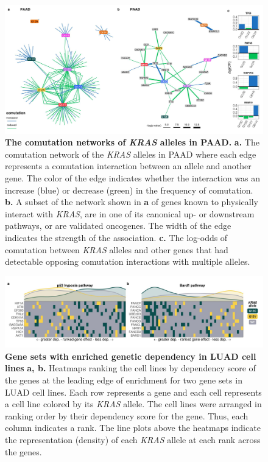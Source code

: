 \documentclass[english, 10pt, letterpaper]{article}
\newcommand{\KRAS}{\emph{KRAS}}
\begin{document}
\begin{figure}[h!]
\centering
\includegraphics[width=180mm]{figures/Supp_Fig_4.jpeg}
\caption{
    \textbf{The comutation networks of \KRAS{} alleles in PAAD.}
    \textbf{a.} The comutation network of the \KRAS{} alleles in PAAD where each edge represents a comutation interaction between an allele and another gene. The color of the edge indicates whether the interaction was an increase (blue) or decrease (green) in the frequency of comutation.
    \textbf{b.} A subset of the network shown in \textbf{a} of genes known to physically interact with \KRAS{}, are in one of its canonical up- or downstream pathways, or are validated oncogenes. The width of the edge indicates the strength of the association.
    \textbf{c.} The log-odds of comutation between \KRAS{} alleles and other genes that had detectable opposing comutation interactions with multiple alleles.
}
\label{sfig:paad-comutation-network}
\end{figure}
\newpage


\begin{figure}[h!]
\centering
\includegraphics[width=180mm]{figures/Supp_Fig_5.jpeg}
\caption{
    \textbf{Gene sets with enriched genetic dependency in LUAD cell lines}
    \textbf{a, b.} Heatmaps ranking the cell lines by dependency score of the genes at the leading edge of enrichment for two gene sets in LUAD cell lines. Each row represents a gene and each cell represents a cell line colored by its \KRAS{} allele. The cell lines were arranged in ranking order by their dependency score for the gene. Thus, each column indicates a rank. The line plots above the heatmaps indicate the representation (density) of each \KRAS{} allele at each rank across the genes.
}
\label{sfig:luad-dependency-gsea}
\end{figure}
\newpage
\end{document}
